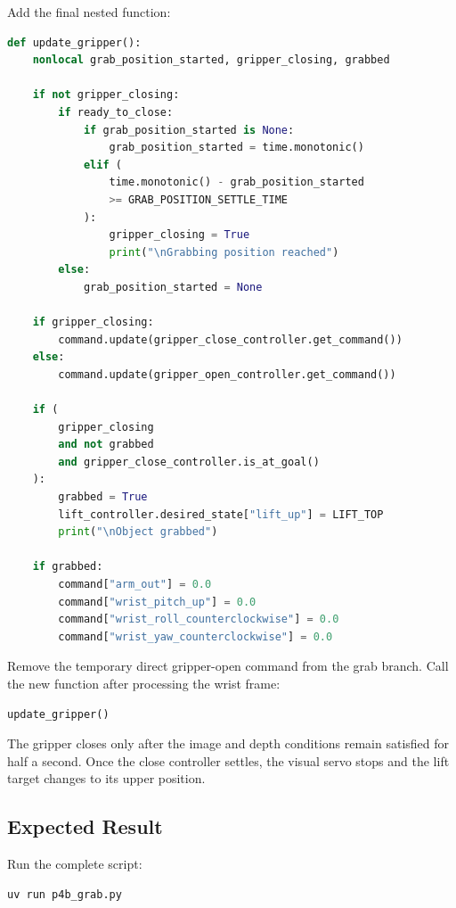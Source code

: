 \documentclass[11pt,a4paper]{article}
\begin{document}
Add the final nested function:

\begin{lstlisting}[language=Python]
def update_gripper():
    nonlocal grab_position_started, gripper_closing, grabbed

    if not gripper_closing:
        if ready_to_close:
            if grab_position_started is None:
                grab_position_started = time.monotonic()
            elif (
                time.monotonic() - grab_position_started
                >= GRAB_POSITION_SETTLE_TIME
            ):
                gripper_closing = True
                print("\nGrabbing position reached")
        else:
            grab_position_started = None

    if gripper_closing:
        command.update(gripper_close_controller.get_command())
    else:
        command.update(gripper_open_controller.get_command())

    if (
        gripper_closing
        and not grabbed
        and gripper_close_controller.is_at_goal()
    ):
        grabbed = True
        lift_controller.desired_state["lift_up"] = LIFT_TOP
        print("\nObject grabbed")

    if grabbed:
        command["arm_out"] = 0.0
        command["wrist_pitch_up"] = 0.0
        command["wrist_roll_counterclockwise"] = 0.0
        command["wrist_yaw_counterclockwise"] = 0.0
\end{lstlisting}

Remove the temporary direct gripper-open command from the grab branch. Call
the new function after processing the wrist frame:

\begin{lstlisting}[language=Python]
update_gripper()
\end{lstlisting}

The gripper closes only after the image and depth conditions remain satisfied
for half a second. Once the close controller settles, the visual servo stops
and the lift target changes to its upper position.

\subsection*{Expected Result}

Run the complete script:

\begin{lstlisting}[language=bash]
uv run p4b_grab.py
\end{lstlisting}
\end{document}
